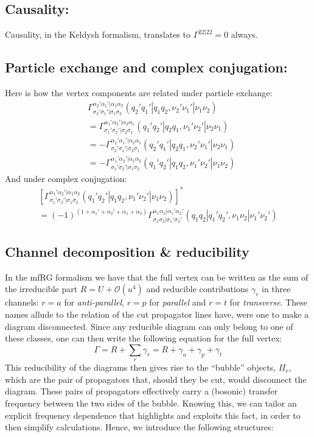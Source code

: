\documentclass[12pt,a4paper,roman]{article}
\begin{document}
\subsection*{Causality:}
Causality, in the Keldysh formalism, translates to $\Gamma^{22|22} = 0$ always.

\subsection*{Particle exchange and complex conjugation:}
Here is how the vertex components are related under particle exchange:
\begin{align}
&\Gamma_{\sigma_2'\sigma_1'|\sigma_1\sigma_2}^{\alpha_2'\alpha_1'|\alpha_1\alpha_2}(q_2'q_1'|q_1q_2, \nu_2'\nu_1'|\nu_1\nu_2) \\
&= \Gamma_{\sigma_1'\sigma_2'|\sigma_2\sigma_1}^{\alpha_1'\alpha_2'|\alpha_2\alpha_1}(q_1'q_2'|q_2q_1, \nu_1'\nu_2'|\nu_2\nu_1) \\
&= - \Gamma_{\sigma_2'\sigma_1'|\sigma_2\sigma_1}^{\alpha_2'\alpha_1'|\alpha_2\alpha_1}(q_2'q_1'|q_2q_1, \nu_2'\nu_1'|\nu_2\nu_1) \\
&= - \Gamma_{\sigma_1'\sigma_2'|\sigma_1\sigma_2}^{\alpha_1'\alpha_2'|\alpha_1\alpha_2}(q_1'q_2'|q_1q_2, \nu_1'\nu_2'|\nu_1\nu_2)
\end{align}
And under complex conjugation:
\begin{multline}
\left[ \Gamma_{\sigma_1'\sigma_2'|\sigma_1\sigma_2}^{\alpha_1'\alpha_2'|\alpha_1\alpha_2}(q_1'q_2'|q_1q_2, \nu_1'\nu_2'|\nu_1\nu_2) \right]^* \\ =
(-1)^{(1+\alpha_1'+\alpha_2'+\alpha_1+\alpha_2)} \Gamma_{\sigma_1\sigma_2|\sigma_1'\sigma_2'}^{\alpha_1\alpha_2|\alpha_1'\alpha_2'}(q_1q_2|q_1'q_2', \nu_1\nu_2|\nu_1'\nu_2')
\end{multline}

\subsection*{Channel decomposition \& reducibility}
In the mfRG formalism we have that the full vertex can be written as the sum of the irreducible part $R = U + \mathcal{O}(u^4)$ and reducible contributions $\gamma_r$ in three channels: $r=a$ for \textit{anti-parallel}, $r=p$ for \textit{parallel} and $r=t$ for \textit{transverse}. These names allude to the relation of the cut propagator lines have, were one to make a diagram disconnected. Since any reducible diagram can only belong to one of these classes\cite{}, one can then write the following equation for the full vertex:
\begin{equation}
	\Gamma = R + \sum_r \gamma_r = R + \gamma_a + \gamma_p + \gamma_t
\end{equation}
This reducibility of the diagrams then gives rise to the ``bubble'' objects, $\Pi_r$, which are the pair of propagators that, should they be cut, would disconnect the diagram. These pairs of propagators effectively carry a (bosonic) transfer frequency between the two sides of the bubble. Knowing this, we can tailor an explicit frequency dependence that highlights and exploits this fact, in order to then simplify calculations. Hence, we introduce the following structures:
\end{document}
